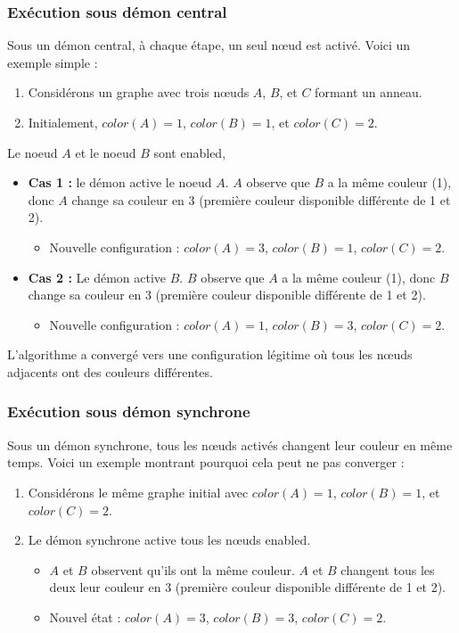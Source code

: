 \documentclass[11pt]{article}
\begin{document}
\subsubsection{Exécution sous démon central}
\label{sec:org3cee252}
Sous un démon central, à chaque étape, un seul nœud est activé. Voici un exemple simple :

\begin{enumerate}
\item Considérons un graphe avec trois nœuds \(A\), \(B\), et \(C\) formant un anneau.
\item Initialement, \(color(A) = 1\), \(color(B) = 1\), et \(color(C) = 2\).
\end{enumerate}

Le noeud \(A\) et le noeud \(B\) sont enabled, 

\begin{itemize}
\item \textbf{\textbf{Cas 1 :}} le démon active le noeud \(A\). \(A\) observe que \(B\) a la même couleur (1), donc \(A\) change sa couleur en 3 (première couleur disponible différente de 1 et 2).
\begin{itemize}
\item Nouvelle configuration : \(color(A) = 3\), \(color(B) = 1\), \(color(C) = 2\).
\end{itemize}
\item \textbf{\textbf{Cas 2 :}} Le démon active \(B\). \(B\) observe que \(A\) a la même couleur (1), donc \(B\) change sa couleur en 3 (première couleur disponible différente de 1 et 2).
\begin{itemize}
\item Nouvelle configuration : \(color(A) = 1\), \(color(B) = 3\), \(color(C) = 2\).
\end{itemize}
\end{itemize}

L'algorithme a convergé vers une configuration légitime où tous les nœuds adjacents ont des couleurs différentes.

\subsubsection{Exécution sous démon synchrone}
\label{sec:org0fd9176}
Sous un démon synchrone, tous les nœuds activés changent leur couleur en même temps. Voici un exemple montrant pourquoi cela peut ne pas converger :

\begin{enumerate}
\item Considérons le même graphe initial avec \(color(A) = 1\), \(color(B) = 1\), et \(color(C) = 2\).

\item Le démon synchrone active tous les nœuds enabled.
\begin{itemize}
\item \(A\) et \(B\) observent qu'ils ont la même couleur. \(A\) et \(B\) changent tous les deux leur couleur en 3 (première couleur disponible différente de 1 et 2).
\item Nouvel état : \(color(A) = 3\), \(color(B) = 3\), \(color(C) = 2\).
\end{itemize}
\end{enumerate}
\end{document}
